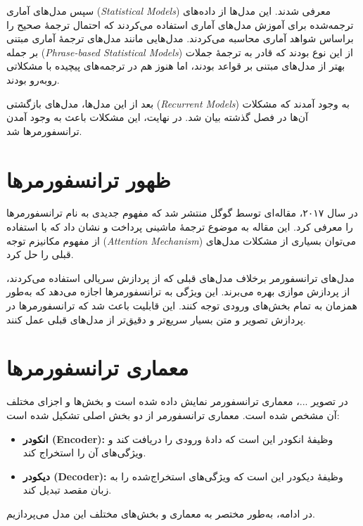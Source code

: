 سپس مدل‌های آماری (\textit{Statistical Models}) معرفی شدند. این مدل‌ها از داده‌های ترجمه‌شده برای آموزش مدل‌های آماری استفاده می‌کردند که احتمال ترجمهٔ صحیح را براساس شواهد آماری محاسبه می‌کردند. مدل‌هایی مانند مدل‌های ترجمهٔ آماری مبتنی بر جمله (\textit{Phrase-based Statistical Models}) از این نوع بودند که قادر به ترجمهٔ جملات بهتر از مدل‌های مبتنی بر قواعد بودند، اما هنوز هم در ترجمه‌های پیچیده با مشکلاتی روبه‌رو بودند.

بعد از این مدل‌ها، مدل‌های بازگشتی (\textit{Recurrent Models}) به وجود آمدند که مشکلات آن‌ها در فصل گذشته بیان شد. در نهایت، این مشکلات باعث به وجود آمدن ترانسفورمرها شد.

\section{ظهور ترانسفورمرها}
در سال ۲۰۱۷، مقاله‌ای توسط گوگل منتشر شد که مفهوم جدیدی به نام ترانسفورمرها را معرفی کرد. این مقاله به موضوع ترجمهٔ ماشینی پرداخت و نشان داد که با استفاده از مفهوم مکانیزم توجه (\textit{Attention Mechanism}) می‌توان بسیاری از مشکلات مدل‌های قبلی را حل کرد. 

مدل‌های ترانسفورمر برخلاف مدل‌های قبلی که از پردازش سریالی استفاده می‌کردند، از پردازش موازی بهره می‌برند. این ویژگی به ترانسفورمرها اجازه می‌دهد که به‌طور همزمان به تمام بخش‌های ورودی توجه کنند. این قابلیت باعث شد که ترانسفورمرها در پردازش تصویر و متن بسیار سریع‌تر و دقیق‌تر از مدل‌های قبلی عمل کنند.

\section{معماری ترانسفورمرها}
در تصویر ...، معماری ترانسفورمر نمایش داده شده است و بخش‌ها و اجزای مختلف آن مشخص شده است. معماری ترانسفورمر از دو بخش اصلی تشکیل شده است:
\begin{itemize}
	\item \textbf{انکودر (Encoder):} 
	وظیفهٔ انکودر این است که دادهٔ ورودی را دریافت کند و ویژگی‌های آن را استخراج کند.
	\item \textbf{دیکودر (Decoder):} 
	وظیفهٔ دیکودر این است که ویژگی‌های استخراج‌شده را به زبان مقصد تبدیل کند.
\end{itemize}

در ادامه، به‌طور مختصر به معماری و بخش‌های مختلف این مدل می‌پردازیم.

